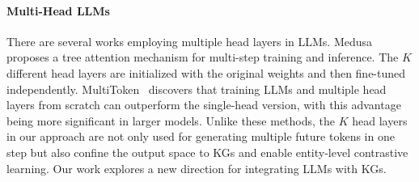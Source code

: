 \paragraph{Multi-Head LLMs}
There are several works employing multiple head layers in LLMs. Medusa~\cite{medusa} proposes a tree attention mechanism for multi-step training and inference. The $K$ different head layers are initialized with the original weights and then fine-tuned independently. MultiToken~\cite{multi-head} discovers that training LLMs and multiple head layers from scratch can outperform the single-head version, with this advantage being more significant in larger models. Unlike these methods, the $K$ head layers in our approach are not only used for generating multiple future tokens in one step but also confine the output space to KGs and enable entity-level contrastive learning. Our work explores a new direction for integrating LLMs with KGs.